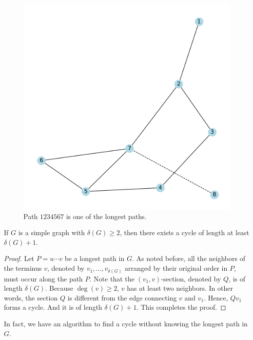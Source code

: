 \documentclass[thmcnt=section, 12pt, color=cyan]{my-elegantbook}
\begin{document}
\begin{figure}[ht]
    \centering
    \includegraphics[scale=0.5]{figures/g-001.png}
    \caption{Path $1234567$ is one of the longest paths.}
    \label{fig:1}
\end{figure}


\begin{proposition} \label{pro:5}
    If $G$ is a simple graph with $\delta(G) \geq 2$, 
	then there exists a cycle of length 
	at least $\delta(G)+1$.
\end{proposition}

\begin{proof}
	Let $P = u \cdots v$ 
	be a longest path in $G$.
	As noted before, all the neighbors of 
	the terminus $ v $,
	denoted by $v_1, \ldots, v_{\delta(G)}$
	arranged by their original order in $P$,
	must occur along the path $P$.
	Note that the $(v_1, v)$-section,
	denoted by $Q$,
	is of length $\delta(G)$.
	Because $\deg(v) \geq 2$, 
	$v$ has at least two neighbors. 
	In other words,
	the section $Q$ is different from the edge 
	connecting $v$ and $v_1$.
	Hence, $Q v_1$ forms a cycle.
	And it is of length $\delta(G) + 1$.
	This completes the proof.
\end{proof}

In fact, we have an algorithm to find a cycle without knowing the longest path in $G$.
\end{document}
